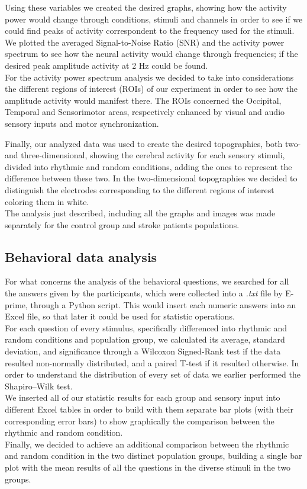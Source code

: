 Using these variables we created the desired graphs, showing how the activity power would change through conditions, stimuli and channels in order to see if we could find peaks of activity correspondent to the frequency used for the stimuli. We plotted the averaged Signal-to-Noise Ratio (SNR) and the activity power spectrum to see how the neural activity would change through frequencies; if the desired peak amplitude activity at 2 Hz could be found. \\
For the activity power spectrum analysis we decided to take into considerations the different regions of interest (ROIs) of our experiment in order to see how the amplitude activity would manifest there. The ROIs concerned the Occipital, Temporal and Sensorimotor areas, respectively enhanced by visual and audio sensory inputs and motor synchronization.

Finally, our analyzed data was used to create the desired topographies, both two- and three-dimensional, showing the cerebral activity for each sensory stimuli, divided into rhythmic and random conditions, adding the ones to represent the difference between these two. In the two-dimensional topographies we decided to distinguish the electrodes corresponding to the different regions of interest coloring them in white. \\
The analysis just described, including all the graphs and images was made separately for the control group and stroke patients populations. 

\subsection{Behavioral data analysis}
For what concerns the analysis of the behavioral questions, we searched for all the answers given by the participants, which were collected into a \textit{.txt} file by E-prime, through a Python script. This would insert each numeric answers into an Excel file, so that later it could be used for statistic operations. \\
For each question of every stimulus, specifically differenced into rhythmic and random conditions and population group, we calculated its average, standard deviation, and significance through a Wilcoxon Signed-Rank test if the data resulted non-normally distributed, and a paired T-test if it resulted otherwise. In order to understand the distribution of every set of data we earlier performed the Shapiro–Wilk test. \\
We inserted all of our statistic results for each group and sensory input into different Excel tables in order to build with them separate bar plots (with their corresponding error bars) to show graphically the comparison between the rhythmic and random condition. \\
Finally, we decided to achieve an additional comparison between the rhythmic and random condition in the two distinct population groups, building a single bar plot with the mean results of all the questions in the diverse stimuli in the two groups. 

